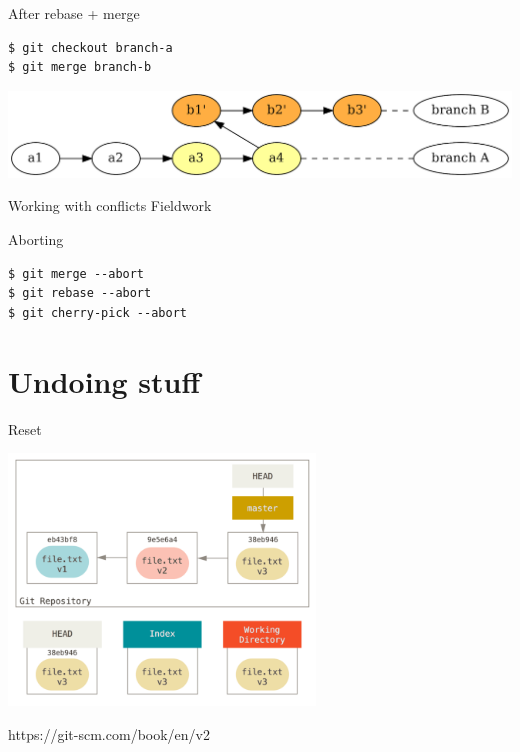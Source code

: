 \documentclass[presentation,aspectratio=169,smaller]{beamer}
\begin{document}
\begin{frame}[label={sec:org0e73213},fragile]{After rebase + merge}
 \begin{verbatim}
$ git checkout branch-a
$ git merge branch-b
\end{verbatim}

\begin{center}
\includegraphics[width=.9\linewidth]{images/merging-vs-rebasing-2.png}
\end{center}
\end{frame}

\begin{frame}[label={sec:org1402284}]{Working with conflicts}
Fieldwork
\end{frame}

\begin{frame}[label={sec:orgf7c305d},fragile]{Aborting}
 \begin{verbatim}
$ git merge --abort
$ git rebase --abort
$ git cherry-pick --abort
\end{verbatim}
\end{frame}

\section{Undoing stuff}
\label{sec:org3b8d19a}

\begin{frame}[label={sec:orge6de410}]{Reset}
\begin{center}
\includegraphics[height=6.7cm]{images/reset-start.png}
\end{center}

\scriptsize{https://git-scm.com/book/en/v2}
\end{frame}
\end{document}
